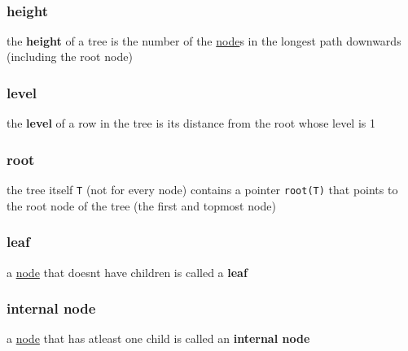 \documentclass[a4paper,12pt]{article}
\begin{document}
\begin{center}

\end{center}\\[0pt]

\subsubsection{height}
\label{sec:org2cfcbaa}
\begin{definition}
the \textbf{height} of a tree is the number of the \hyperref[sec:orgec4976f]{node}s in the longest path downwards (including the root node)\\[0pt]
\end{definition}
\subsubsection{level}
\label{sec:org769a6b1}
\begin{definition}
the \textbf{level} of a row in the tree is its distance from the root whose level is 1\\[0pt]
\end{definition}
\subsubsection{root}
\label{sec:org76387eb}
\begin{definition}
the tree itself \texttt{T} (not for every node) contains a pointer \texttt{root(T)} that points to the root node of the tree (the first and topmost node)\\[0pt]
\end{definition}
\subsubsection{leaf}
\label{sec:orge114c93}
\begin{definition}
a \hyperref[sec:orgec4976f]{node} that doesnt have children is called a \textbf{leaf}\\[0pt]
\end{definition}
\subsubsection{internal node}
\label{sec:org26c1a68}
\begin{definition}
a \hyperref[sec:orgec4976f]{node} that has atleast one child is called an \textbf{internal node}\\[0pt]
\end{definition}
\end{document}

